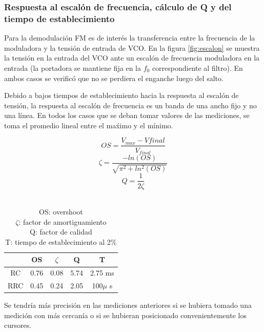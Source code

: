 \documentclass[../../tc_tp6_main.tex]{subfiles}
\begin{document}
\subsubsection{Respuesta al escal\'on de frecuencia, c\'alculo de Q y del tiempo de establecimiento}
Para la demodulaci\'on FM es de inter\'es la transferencia entre la frecuencia de la moduladora y la tensi\'on de entrada de VCO. En la figura \ref{fig:escalon} se muestra la tensi\'on en la entrada del VCO ante un escal\'on de frecuencia moduladora en la entrada (la portadora se mantiene fija en la $f_0$ correspondiente al filtro). En ambos casos se verific\'o que no se perdiera el enganche luego del salto.

Debido a bajos tiempos de establecimiento hacia la respuesta al escal\'on de tensi\'on, la respuesta al escal\'on de frecuencia es un banda de una ancho fijo y no una l\'inea. En todos los casos que se deban tomar valores de las mediciones, se toma el promedio lineal entre el ma\'ximo y el m\'inimo.

\[OS = \frac{V_{max}-V{final}}{V_{final}}\]
\[\zeta = \frac{-ln(OS)}{\sqrt{\pi ^2 + ln^2(OS)}}\]
\[Q = \frac{1}{2\zeta}\]


\begin{table}[H]
	\centering
	\begin{tabular}{|c|c|c|c|c|}
	\hline 
	 & OS & $\zeta$ & Q & T\\ 
	\hline 
	RC & 0.76 & 0.08 & 5.74 & 2.75 ms\\ 
	\hline 
	RRC & 0.45 & 0.24 & 2.05 & 100$\mu$ s \\ 
	\hline 
	\end{tabular} 
	\caption{\\OS: overshoot \\ $\zeta$: factor de amortiguamiento \\ Q: factor de calidad \\ T: tiempo de establecimiento al 2\%}
	\label{Q}
\end{table}

Se tendr\'ia m\'as precisi\'on en las mediciones anteriores si se hubiera tomado una medici\'on con m\'as cercan\'ia o si se hubieran posicionado convenientemente los cursores.
\end{document}
